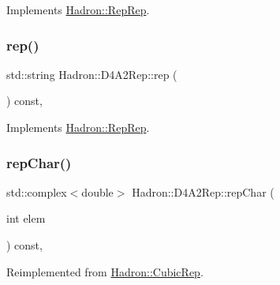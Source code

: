 Implements \mbox{\hyperlink{structHadron_1_1RepRep_ab3213025f6de249f7095892109575fde}{Hadron\+::\+Rep\+Rep}}.

\mbox{\label{structHadron_1_1D4A2Rep_aa51ab214e55a5545100ab53399ceb137}} 
\subsubsection{\texorpdfstring{rep()}{rep()}\hspace{0.1cm}{\footnotesize\ttfamily [3/3]}}
{\footnotesize\ttfamily std\+::string Hadron\+::\+D4\+A2\+Rep\+::rep (\begin{DoxyParamCaption}{ }\end{DoxyParamCaption}) const\hspace{0.3cm}{\ttfamily [inline]}, {\ttfamily [virtual]}}



Implements \mbox{\hyperlink{structHadron_1_1RepRep_ab3213025f6de249f7095892109575fde}{Hadron\+::\+Rep\+Rep}}.

\mbox{\label{structHadron_1_1D4A2Rep_ac408f55785ba08ce215277bb1cb4a006}} 
\subsubsection{\texorpdfstring{repChar()}{repChar()}\hspace{0.1cm}{\footnotesize\ttfamily [1/2]}}
{\footnotesize\ttfamily std\+::complex$<$double$>$ Hadron\+::\+D4\+A2\+Rep\+::rep\+Char (\begin{DoxyParamCaption}\item[{int}]{elem }\end{DoxyParamCaption}) const\hspace{0.3cm}{\ttfamily [inline]}, {\ttfamily [virtual]}}



Reimplemented from \mbox{\hyperlink{structHadron_1_1CubicRep_af45227106e8e715e84b0af69cd3b36f8}{Hadron\+::\+Cubic\+Rep}}.

